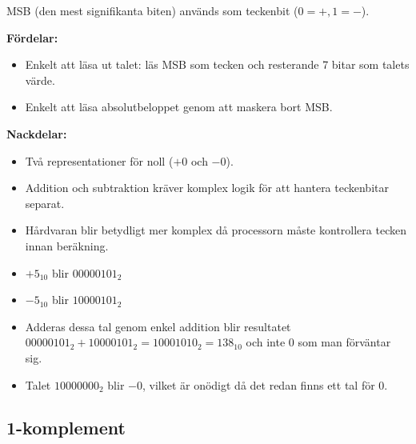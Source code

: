 \documentclass[
  swedish,
  letterpaper,
  oneside,
  openany]{book}
\providecommand{\tightlist}{%
  \setlength{\itemsep}{0pt}\setlength{\parskip}{0pt}}
\begin{document}
MSB (den mest signifikanta biten) används som teckenbit
(\(0 = +, 1 = -\)).

\textbf{Fördelar:}

\begin{itemize}
\tightlist
\item
  Enkelt att läsa ut talet: läs MSB som tecken och resterande 7 bitar
  som talets värde.
\item
  Enkelt att läsa absolutbeloppet genom att maskera bort MSB.
\end{itemize}

\textbf{Nackdelar:}

\begin{itemize}
\tightlist
\item
  Två representationer för noll (\(+0\) och \(-0\)).
\item
  Addition och subtraktion kräver komplex logik för att hantera
  teckenbitar separat.
\item
  Hårdvaran blir betydligt mer komplex då processorn måste kontrollera
  tecken innan beräkning.
\end{itemize}

\begin{tcolorbox}[enhanced jigsaw, arc=.35mm, bottomrule=.15mm, bottomtitle=1mm, breakable, colback=white, colbacktitle=quarto-callout-note-color!10!white, colframe=quarto-callout-note-color-frame, coltitle=black, left=2mm, leftrule=.75mm, opacityback=0, opacitybacktitle=0.6, rightrule=.15mm, title=\textcolor{quarto-callout-note-color}{\faInfo}\hspace{0.5em}{Exempel: 8-bitars Signed-Magnitude}, titlerule=0mm, toprule=.15mm, toptitle=1mm]

\begin{itemize}
\tightlist
\item
  \(+5_{10}\) blir \(00000101_2\)
\item
  \(-5_{10}\) blir \(10000101_2\)
\item
  Adderas dessa tal genom enkel addition blir resultatet
  \(00000101_2 + 10000101_2 = 10001010_2 = 138_{10}\) och inte \(0\) som
  man förväntar sig.
\item
  Talet \(10000000_2\) blir \(-0\), vilket är onödigt då det redan finns
  ett tal för \(0\).
\end{itemize}

\end{tcolorbox}

\subsection{1-komplement}\label{komplement}
\end{document}

